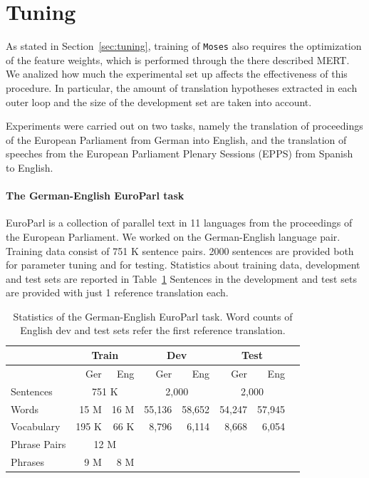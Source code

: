 \documentclass[11pt]{report}
\theoremstyle{plain}
\begin{document}
{\section{Tuning}

\label{sec:exp-tuning}
As stated in Section~\ref{sec:tuning}, training of {\tt Moses} also requires the optimization of the feature weights, which is performed through the there described MERT. We analized how much the experimental set up affects the effectiveness of this procedure. In particular, the amount of translation hypotheses extracted in each outer loop and the size of the development set are taken into account.

Experiments were carried out on two tasks, namely the translation of proceedings of 
the European Parliament from German into English, and the translation  of  speeches from the  European Parliament Plenary Sessions (EPPS) from Spanish to English.

\paragraph{The German-English EuroParl task}
\label{sec:ge-en-europarl-task}
EuroParl \cite{koehn:europarl:mtsummit:2005} is a collection of parallel text in 11 languages from the proceedings of the European Parliament. We worked on the German-English language pair. Training data consist of 751 K sentence pairs. 2000 sentences are provided both for parameter tuning and for testing.  Statistics about training data, development and test sets are reported in Table~\ref{tbl:ge-en-europarl-data}
Sentences in the development and test sets are provided with just 1 reference translation each.  

\begin{table}[th]
\begin{center}
\begin{tabular}{lrr|rr|rrr}
        &  \multicolumn{2}{c|}{Train}   &  \multicolumn{2}{c|}{Dev}    &  \multicolumn{2}{c}{Test}\\
 \hline
        &  Ger   &   Eng  &  Ger   &   Eng  &  Ger   &   Eng     \\
 \hline
Sentences    & \multicolumn{2}{c|}{751 K} & \multicolumn{2}{c|}{2,000} & \multicolumn{2}{c}{2,000}\\
Words & 15 M & 16 M & 55,136 & 58,652 & 54,247 & 57,945\\
Vocabulary  & 195 K & 66 K & 8,796 & 6,114& 8,668 & 6,054&\\
Phrase Pairs  & \multicolumn{2}{c|}{12 M}\\
Phrases & 9 M & 8 M \\
\end{tabular}
\caption{Statistics of the German-English EuroParl task. Word counts of  English dev and test sets refer
 the first reference translation. }
\label{tbl:ge-en-europarl-data}
\end{center}
\end{table}

}
\end{document}
